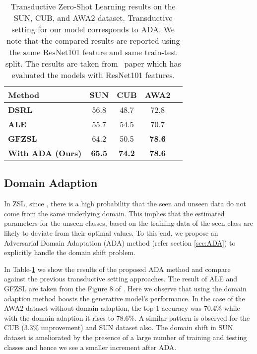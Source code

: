 \documentclass[10pt,twocolumn,letterpaper]{article}
\begin{document}
\begin{table}[h!]
\small
 \centering
 \addtolength{\tabcolsep}{7pt}
 \begin{tabular}{|l| c |c | c | c |} 
 \hline
 \textbf{Method}  & {\textbf{SUN}} & {\textbf{CUB}} &  {\textbf{AWA2}} \\ 
  \hline   
\textbf{DSRL}\cite{ye2017zero_DOMAIN} & 56.8 & 48.7 & 72.8 \\
 \textbf{ALE} \cite{akata2013label}  & 55.7 & 54.5 & 70.7\\
 \textbf{GFZSL} \cite{verma2017simple} &  64.2 &  50.5   & \textbf{78.6} \\
\hline
 \textbf{With ADA (Ours)} & \textbf{65.5}  & \textbf{74.2} &  \textbf{78.6} \\
 \hline
 \end{tabular}
 \caption{Transductive Zero-Shot Learning results on the SUN, CUB, and AWA2 dataset. Transductive setting for our model corresponds to ADA. We note that the compared results are reported using the same ResNet101 feature and same train-test split. The results are taken from~\cite{xian2018zero} paper which has evaluated the models with ResNet101 features. }
 \label{tab:adversarialzsl}
 \vspace{-1.5em}
\end{table}

\subsection{Domain Adaption}
In ZSL, since , there is a high probability that the seen and 
unseen data do not come from the same underlying domain. This implies that the estimated parameters for the unseen classes, based on the training data of the seen class are likely to deviate from their optimal values. To this end, we propose an Adversarial Domain Adaptation (ADA) method (refer section \ref{sec:ADA}) to explicitly handle the domain shift problem. 

In Table-\ref{tab:adversarialzsl}  we show the results of the proposed ADA method and compare against the previous transductive setting approaches. The result of ALE \cite{akata2013label} and GFZSL \cite{verma2017simple} are taken from the Figure 8 of \cite{xian2018zero}. Here we observe that using the domain adaption method boosts the generative model's performance. In the case of the AWA2 dataset without domain adaption, the top-1 accuracy was 70.4\% while with the domain adaption it rises to 78.6\%. A similar pattern is observed for the CUB (3.3\% improvement) and SUN dataset also. The domain shift in SUN dataset is ameliorated by the presence of a large number of training and testing classes and hence we see a smaller increment after ADA. 
\end{document}
